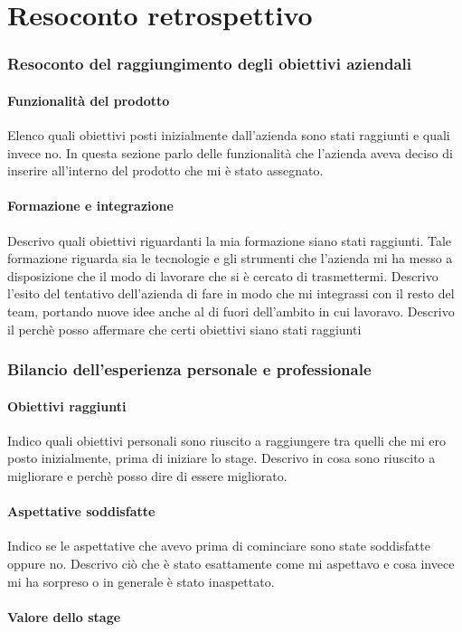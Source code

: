 \part{Resoconto retrospettivo}
	\section{Resoconto del raggiungimento degli obiettivi aziendali}
		\subsection{Funzionalità del prodotto}
			Elenco quali obiettivi posti inizialmente dall'azienda sono stati raggiunti e quali invece no. In questa sezione parlo delle
			funzionalità che l'azienda aveva deciso di inserire all'interno del prodotto che mi è stato assegnato.
		\subsection{Formazione e integrazione}
			Descrivo quali obiettivi riguardanti la mia formazione siano stati raggiunti. Tale formazione riguarda sia le tecnologie e
			gli strumenti che l'azienda mi ha messo a disposizione che il modo di lavorare che si è cercato di trasmettermi. Descrivo
			l'esito del tentativo dell'azienda di fare in modo che mi integrassi con il resto del team, portando nuove idee anche al di
			fuori dell'ambito in cui lavoravo. Descrivo il perchè posso affermare che certi obiettivi siano stati raggiunti
	\section{Bilancio dell'esperienza personale e professionale}
		\subsection{Obiettivi raggiunti}
			Indico quali obiettivi personali sono riuscito a raggiungere tra quelli che mi ero posto inizialmente, prima di iniziare
			lo stage. Descrivo in cosa sono riuscito a migliorare e perchè posso dire di essere migliorato.
		\subsection{Aspettative soddisfatte}
			Indico se le aspettative che avevo prima di cominciare sono state soddisfatte oppure no. Descrivo ciò che è stato esattamente
			come mi aspettavo e cosa invece mi ha sorpreso o in generale è stato inaspettato.
		\subsection{Valore dello stage}
